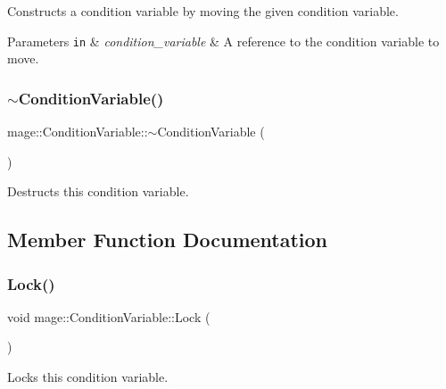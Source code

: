 Constructs a condition variable by moving the given condition variable.


\begin{DoxyParams}[1]{Parameters}
\mbox{\tt in}  & {\em condition\+\_\+variable} & A reference to the condition variable to move. \\
\hline
\end{DoxyParams}
\hypertarget{structmage_1_1_condition_variable_accd5253beb65b2904428afdb889cf00b}{}\label{structmage_1_1_condition_variable_accd5253beb65b2904428afdb889cf00b} 
\subsubsection{\texorpdfstring{$\sim$\+Condition\+Variable()}{~ConditionVariable()}}
{\footnotesize\ttfamily mage\+::\+Condition\+Variable\+::$\sim$\+Condition\+Variable (\begin{DoxyParamCaption}{ }\end{DoxyParamCaption})}

Destructs this condition variable. 

\subsection{Member Function Documentation}
\hypertarget{structmage_1_1_condition_variable_aab712c41e76c444606d5419a20d87b7a}{}\label{structmage_1_1_condition_variable_aab712c41e76c444606d5419a20d87b7a} 
\subsubsection{\texorpdfstring{Lock()}{Lock()}}
{\footnotesize\ttfamily void mage\+::\+Condition\+Variable\+::\+Lock (\begin{DoxyParamCaption}{ }\end{DoxyParamCaption})\hspace{0.3cm}{\ttfamily [noexcept]}}

Locks this condition variable. \hypertarget{structmage_1_1_condition_variable_ac83eae5353cd004ee06fe2376e5bdbf4}{}\label{structmage_1_1_condition_variable_ac83eae5353cd004ee06fe2376e5bdbf4} 
